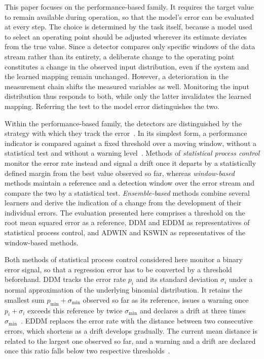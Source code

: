 This paper focuses on the performance-based family. It requires the target value to remain available during operation, so that the model's error can be evaluated at every step. The choice is determined by the task itself, because a model used to select an operating point should be adjusted wherever its estimate deviates from the true value. Since a detector compares only specific windows of the data stream rather than its entirety, a deliberate change to the operating point constitutes a change in the observed input distribution, even if the system and the learned mapping remain unchanged. However, a deterioration in the measurement chain shifts the measured variables as well. Monitoring the input distribution thus responds to both, while only the latter invalidates the learned mapping. Referring the test to the model error distinguishes the two. \par
%
Within the performance-based family, the detectors are distinguished by the strategy with which they track the error~\cite{bayram.2022a}. In its simplest form, a performance indicator is compared against a fixed threshold over a moving window, without a statistical test and without a warning level~\cite{gama.2014}. Methods of \emph{statistical process control} monitor the error rate instead and signal a drift once it departs by a statistically defined margin from the best value observed so far, whereas \emph{window-based} methods maintain a reference and a detection window over the error stream and compare the two by a statistical test. \emph{Ensemble-based} methods combine several learners and derive the indication of a change from the development of their individual errors. The evaluation presented here comprises a threshold on the root mean squared error as a reference, DDM and EDDM as representatives of statistical process control, and ADWIN and KSWIN as representatives of the window-based methods. \par
%
Both methods of statistical process control considered here monitor a binary error signal, so that a regression error has to be converted by a threshold beforehand. DDM tracks the error rate $p_i$ and its standard deviation $\sigma_i$ under a normal approximation of the underlying binomial distribution. It retains the smallest sum $p_{\mathrm{min}} + \sigma_{\mathrm{min}}$ observed so far as its reference, issues a warning once $p_i + \sigma_i$ exceeds this reference by twice $\sigma_{\mathrm{min}}$ and declares a drift at three times $\sigma_{\mathrm{min}}$~\cite{gama.2004}. EDDM replaces the error rate with the distance between two consecutive errors, which shortens as a drift develops gradually. The current mean distance is related to the largest one observed so far, and a warning and a drift are declared once this ratio falls below two respective thresholds~\cite{baena.2006}. \par

